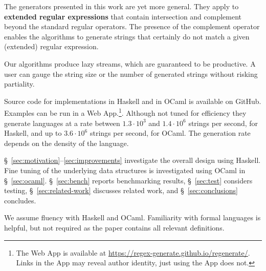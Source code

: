 The generators presented in this work are yet more general. They
apply to \textbf{extended regular expressions} that contain
intersection and complement beyond the standard regular operators. The presence
of the complement operator enables the algorithms to generate strings
that certainly do not match a given (extended) regular expression.

Our algorithms produce lazy streams, which are guaranteed to be
productive. A user can gauge the string size or the
number of generated strings without risking partiality.

Source code for implementations in Haskell and in OCaml is available
on GitHub. Examples can be run in a Web App.\footnote{%
  The Web App is available at
  \url{https://regex-generate.github.io/regenerate/}.  Links in the App may
  reveal author identity, just using the App does not.  }.  Although
not tuned for efficiency they generate languages at a rate
between $1.3\cdot10^3$ and $1.4\cdot10^6$ strings per second, for
Haskell, and up to $3.6\cdot10^6$ strings per second, for OCaml. The
generation rate depends on the density of the language.

\S~\ref{sec:motivation}--\ref{sec:improvements} investigate the
overall design using Haskell. Fine tuning of the underlying data
structures is investigated using OCaml in \S~\ref{sec:ocaml}.
\S~\ref{sec:bench} reports benchmarking results, \S~\ref{sec:test}
considers testing, \S~\ref{sec:related-work} discusses related work,
and \S~\ref{sec:conclusions} concludes.

We assume fluency with Haskell and OCaml. 
Familiarity with formal languages is helpful, but not required as the
paper contains all relevant definitions. 

